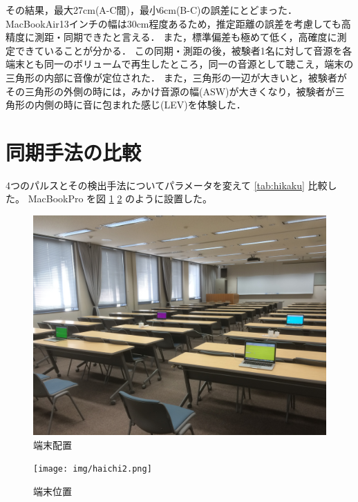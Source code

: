 その結果，最大27cm(A-C間)，最小6cm(B-C)の誤差にとどまった．
MacBookAir13インチの幅は30cm程度あるため，推定距離の誤差を考慮しても高精度に測距・同期できたと言える．
また，標準偏差も極めて低く，高確度に測定できていることが分かる．
この同期・測距の後，被験者1名に対して音源を各端末とも同一のボリュームで再生したところ，同一の音源として聴こえ，端末の三角形の内部に音像が定位された．
また，三角形の一辺が大きいと，被験者がその三角形の外側の時には，みかけ音源の幅(ASW)が大きくなり，被験者が三角形の内側の時に音に包まれた感じ(LEV)を体験した．


\section{同期手法の比較}


4つのパルスとその検出手法についてパラメータを変えて \ref{tab:hikaku} 比較した。
MacBookPro を図 \ref{fig:haichi1} \ref{fig:haichi2} のように設置した。

\begin{figure}[p]
  \centering
  \includegraphics[clip,width=1.05\hsize]{img/haichi1.jpg}
  \caption{端末配置}\label{fig:haichi1}
\end{figure}

\begin{figure}[p]
  \centering
  \texttt{[image: img/haichi2.png]}
  \caption{端末位置}\label{fig:haichi2}
\end{figure}



\clearpage



